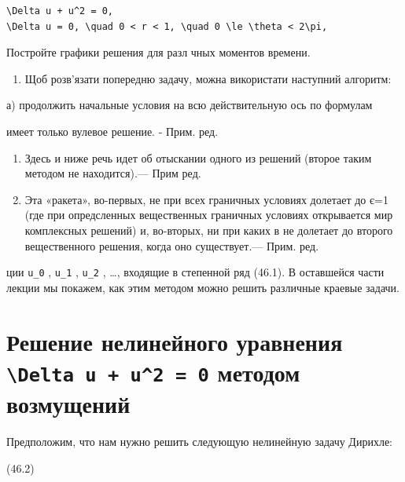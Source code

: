 \documentclass[
  ukrainian,
]{article}
\providecommand{\tightlist}{%
  \setlength{\itemsep}{0pt}\setlength{\parskip}{0pt}}
\begin{document}
\begin{verbatim}
\Delta u + u^2 = 0,
\Delta u = 0, \quad 0 < r < 1, \quad 0 \le \theta < 2\pi,
\end{verbatim}

Постройте графики решения для разл чных моментов времени.

\begin{enumerate}
\def\labelenumi{\arabic{enumi}.}
\setcounter{enumi}{1}
\tightlist
\item
  Щоб розв'язати попередню задачу, можна використати наступний алгоритм:
\end{enumerate}

а) продолжить начальные условия на всю действительную ось по формулам

имеет только вулевое решение. - Прим. ред.

\begin{enumerate}
\def\labelenumi{\arabic{enumi})}
\setcounter{enumi}{1}
\item
  Здесь и ниже речь идет об отыскании одного из решений (второе таким
  методом не находится).--- Прим ред.
\item
  Эта «ракета», во-первых, не при всех граничных условиях долетает до
  є=1 (где при опредсленных вещественных граничных условиях открывается
  мир комплексных решений) и, во-вторых, ни при каких в не долетает до
  второго вещественного решения, когда оно существует.--- Прим. ред.
\end{enumerate}

ции \texttt{u\_0} , \texttt{u\_1} , \texttt{u\_2} , \ldots, входящие в
степенной ряд (46.1). В оставшейся части лекции мы покажем, как этим
методом можно решить различные краевые задачи.

\section{\texorpdfstring{Решение нелинейного уравнения
\texttt{\textbackslash{}Delta\ u\ +\ u\^{}2\ =\ 0} методом
возмущений}{Решение нелинейного уравнения \textbackslash Delta u + u\^{}2 = 0 методом возмущений}}\label{ux440ux435ux448ux435ux43dux438ux435-ux43dux435ux43bux438ux43dux435ux439ux43dux43eux433ux43e-ux443ux440ux430ux432ux43dux435ux43dux438ux44f-delta-u-u2-0-ux43cux435ux442ux43eux434ux43eux43c-ux432ux43eux437ux43cux443ux449ux435ux43dux438ux439}

Предположим, что нам нужно решить следующую нелинейную задачу Дирихле:

(46.2)
\end{document}
